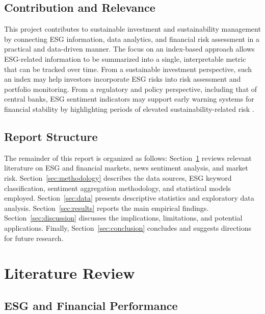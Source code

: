 \documentclass[12pt,a4paper]{article}
\newcommand{\secref}[1]{Section~\ref{#1}}
\begin{document}
\subsection{Contribution and Relevance}
\label{subsec:contribution}

This project contributes to sustainable investment and sustainability management by connecting ESG information, data analytics, and financial risk assessment in a practical and data-driven manner. The focus on an index-based approach allows ESG-related information to be summarized into a single, interpretable metric that can be tracked over time. From a sustainable investment perspective, such an index may help investors incorporate ESG risks into risk assessment and portfolio monitoring. From a regulatory and policy perspective, including that of central banks, ESG sentiment indicators may support early warning systems for financial stability by highlighting periods of elevated sustainability-related risk \citep{ngfs2019call}.

\subsection{Report Structure}
\label{subsec:structure}

The remainder of this report is organized as follows: \secref{sec:literature} reviews relevant literature on ESG and financial markets, news sentiment analysis, and market risk. \secref{sec:methodology} describes the data sources, ESG keyword classification, sentiment aggregation methodology, and statistical models employed. \secref{sec:data} presents descriptive statistics and exploratory data analysis. \secref{sec:results} reports the main empirical findings. \secref{sec:discussion} discusses the implications, limitations, and potential applications. Finally, \secref{sec:conclusion} concludes and suggests directions for future research.


\section{Literature Review}
\label{sec:literature}

\subsection{ESG and Financial Performance}
\label{subsec:lit-esg}
\end{document}
